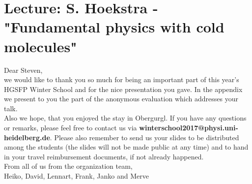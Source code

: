 \documentclass[11pt,a4paper]{article}
\begin{document}
\section*{Lecture: S. Hoekstra - "Fundamental physics with cold molecules"}

Dear Steven,\\
we would like to thank you so much for being an important part of this year's HGSFP Winter School and for the nice presentation you gave.
In the appendix we present to you the part of the anonymous evaluation which addresses your talk.\\
Also we hope, that you enjoyed the stay in Obergurgl. If you have any questions or remarks, please feel free to contact us via \textbf{winterschool2017@physi.uni-heidelberg.de}. Please also remember to send us your slides to be distributed among the students (the slides will not be made public at any time) and to hand in your travel reimbursement documents, if not already happened.\\
From all of us from the organization team,\\
Heiko, David, Lennart, Frank, Janko and Merve
\end{document}

